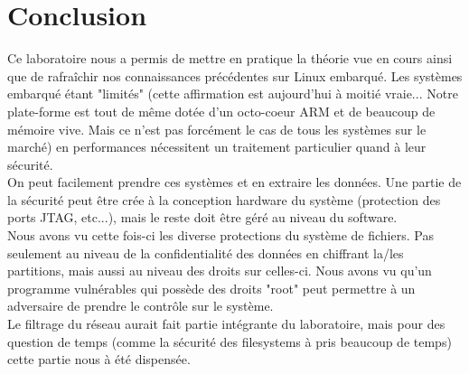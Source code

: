
\chapter{Conclusion} %

\label{Conclusion} %



Ce laboratoire nous a permis de mettre en pratique la théorie vue en cours ainsi que de rafraîchir nos connaissances précédentes sur Linux embarqué. Les systèmes embarqué étant "limités" (cette affirmation est aujourd'hui à moitié vraie... Notre plate-forme est tout de même dotée d'un octo-coeur ARM et de beaucoup de mémoire vive. Mais ce n'est pas forcément le cas de tous les systèmes sur le marché) en performances nécessitent un traitement particulier quand à leur sécurité.\\ 

On peut facilement prendre ces systèmes et en extraire les données. Une partie de la sécurité peut être crée à la conception hardware du système (protection des ports JTAG, etc...), mais le reste doit être géré au niveau du software. \\

Nous avons vu cette fois-ci les diverse protections du système de fichiers. Pas seulement au niveau de la confidentialité des données en chiffrant la/les partitions, mais aussi au niveau des droits sur celles-ci. Nous avons vu qu'un programme vulnérables qui possède des droits "root" peut permettre à un adversaire de prendre le contrôle sur le système.\\

Le filtrage du réseau aurait fait partie intégrante du laboratoire, mais pour des question de temps (comme la sécurité des filesystems à pris beaucoup de temps) cette partie nous à été dispensée.

